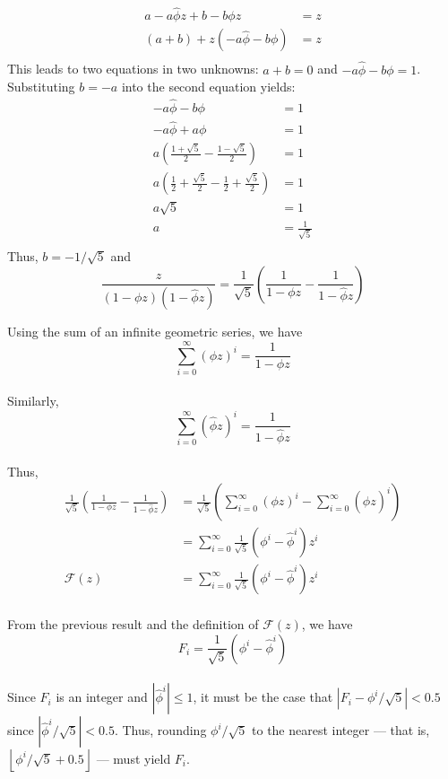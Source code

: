 {\begin{list}{\textbf{}}{}
\begin{align*}
a-a\hat\phi z+b-b\phi z&=z\\
\left(a+b\right)+z\left(-a\hat\phi-b\phi\right)&=z\\
\end{align*}\noindent
This leads to two equations in two unknowns: $a+b=0$ and $-a\hat\phi-b\phi=1$.
Substituting $b=-a$ into the second equation yields:
\begin{align*}
-a\hat\phi-b\phi&=1\\
-a\hat\phi+a\phi&=1\\
a\left(\frac{1+\sqrt{5}}{2}-\frac{1-\sqrt{5}}{2}\right)&=1\\
a\left(\frac{1}{2}+\frac{\sqrt{5}}{2}-\frac{1}{2}+\frac{\sqrt{5}}{2}\right)&=1\\
a\sqrt{5}&=1\\
a&=\frac{1}{\sqrt{5}}\\
\end{align*}\noindent
Thus, $b=-1/\sqrt{5}$ and $$\frac{z}{\left(1-\phi z\right)\left(1-\hat\phi z
\right)}=\frac{1}{\sqrt{5}}\left(\frac{1}{1-\phi z}-\frac{1}{1-\hat\phi z}
\right)$$
\item Using the sum of an infinite geometric series, we have $$\sum_{i=0}^\infty
\left(\phi z\right)^i=\frac{1}{1-\phi z}$$\\ Similarly, $$\sum_{i=0}^\infty
\left(\hat\phi z\right)^i=\frac{1}{1-\hat\phi z}$$\\ Thus,
\begin{align*}
\frac{1}{\sqrt{5}}\left(\frac{1}{1-\phi z}-\frac{1}{1-\hat\phi z}\right)&=
\frac{1}{\sqrt{5}}\left(\sum_{i=0}^\infty\left(\phi z\right)^i-\sum_{i=0}
^\infty\left(\hat\phi z\right)^i\right)\\
&=\sum_{i=0}^\infty\frac{1}{\sqrt{5}}\left(\phi^i-\hat\phi^i\right)z^i\\
\mathscr{F}(z)&=\sum_{i=0}^\infty\frac{1}{\sqrt{5}}\left(\phi^i-\hat\phi^i
\right)z^i\\
\end{align*}
\item From the previous result and the definition of $\mathscr{F}(z)$, we have
$$F_i=\frac{1}{\sqrt{5}}\left(\phi^i-\hat\phi^i\right)$$\\ Since $F_i$ is an
integer and $\left|\hat\phi^i\right|\le1$, it must be the case that $\left|F_i-
\phi^i/\sqrt{5}\right|<0.5$ since $\left|\hat\phi^i/\sqrt{5}\right|<0.5$. Thus,
rounding $\phi^i/\sqrt{5}$ to the nearest integer --- that is, $\left\lfloor
\phi^i/\sqrt{5}+0.5\right\rfloor$ --- must yield $F_i$.
\end{list}
}
\newpage
\fi
